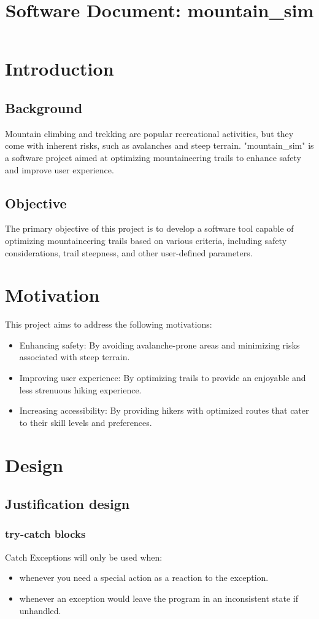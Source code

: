 \documentclass{article}
\title{Software Document: mountain\_sim}
\author{}
\date{}
\begin{document}
\maketitle

\section{Introduction}
\subsection{Background}
Mountain climbing and trekking are popular recreational activities, but they come with inherent risks, such as avalanches and steep terrain. "mountain\_sim" is a software project aimed at optimizing mountaineering trails to enhance safety and improve user experience.

\subsection{Objective}
The primary objective of this project is to develop a software tool capable of optimizing mountaineering trails based on various criteria, including safety considerations, trail steepness, and other user-defined parameters.

\section{Motivation}
This project aims to address the following motivations:
\begin{itemize}[label=-]
    \item Enhancing safety: By avoiding avalanche-prone areas and minimizing risks associated with steep terrain.
    \item Improving user experience: By optimizing trails to provide an enjoyable and less strenuous hiking experience.
    \item Increasing accessibility: By providing hikers with optimized routes that cater to their skill levels and preferences.
\end{itemize}

\section{Design}
\subsection{Justification design}
\subsubsection{try-catch blocks}
Catch Exceptions will only be used when:
\begin{itemize}
\item whenever you need a special action as a reaction to the exception.
\item whenever an exception would leave the program in an inconsistent state if unhandled.
\end{itemize}
\end{document}
